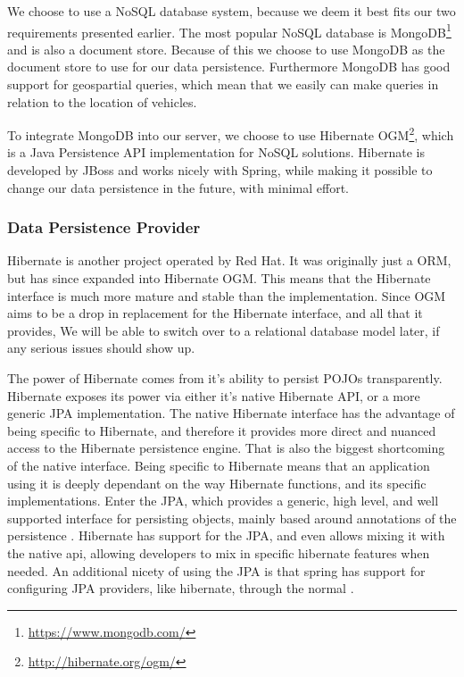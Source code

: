 \bigskip
We choose to use a NoSQL database system, because we deem it best fits our two requirements presented earlier.
The most popular NoSQL database is MongoDB\footnote{\url{https://www.mongodb.com/}} and is also a document store.\cite{DB_RANKINGS}
Because of this we choose to use MongoDB as the document store to use for our data persistence.
Furthermore MongoDB has good support for geospartial queries, which mean that we easily can make queries in relation to the location of vehicles.

\bigskip
To integrate MongoDB into our server, we choose to use Hibernate OGM\footnote{\url{http://hibernate.org/ogm/}}, which is a Java Persistence API implementation for NoSQL solutions.
Hibernate is developed by JBoss and works nicely with Spring, while making it possible to change our data persistence in the future, with minimal effort.

\subsubsection{Data Persistence Provider}
Hibernate is another project operated by Red Hat.
It was originally just a \ac{ORM}, but has since expanded into Hibernate OGM\@.
This means that the Hibernate interface is much more mature and stable than the implementation.
Since OGM aims to be a drop in replacement for the Hibernate interface, and all that it provides, We will be able to switch over to a relational database model later, if any serious issues should show up.

The power of Hibernate comes from it's ability to persist \acp{POJO} transparently.
Hibernate exposes its power via either it's native Hibernate API, or a more generic \ac{JPA} implementation.
The native Hibernate interface has the advantage of being specific to Hibernate, and therefore it provides more direct and nuanced access to the Hibernate persistence engine.
That is also the biggest shortcoming of the native interface.
Being specific to Hibernate means that an application using it is deeply dependant on the way Hibernate functions, and its specific implementations.
Enter the \ac{JPA}, which provides a generic, high level, and well supported interface for persisting objects, mainly based around annotations of the persistence .
Hibernate has support for the \ac{JPA}, and even allows mixing it with the native api, allowing developers to mix in specific hibernate features when needed.
An additional nicety of using the \ac{JPA} is that spring has support for configuring \ac{JPA} providers, like hibernate, through the normal .
